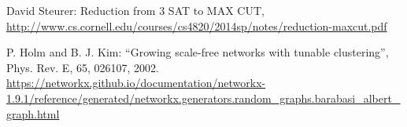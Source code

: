 \documentclass[12pt, a4paper]{article}
\begin{document}
\begin{thebibliography}{9}

David Steurer: Reduction from 3 SAT to MAX CUT,\\
\url{http://www.cs.cornell.edu/courses/cs4820/2014sp/notes/reduction-maxcut.pdf}

P. Holm and B. J. Kim: “Growing scale-free networks with tunable clustering”, Phys. Rev. E, 65, 026107, 2002.\\
\url{https://networkx.github.io/documentation/networkx-1.9.1/reference/generated/networkx.generators.random_graphs.barabasi_albert_graph.html}

\end{thebibliography}
\end{document}
